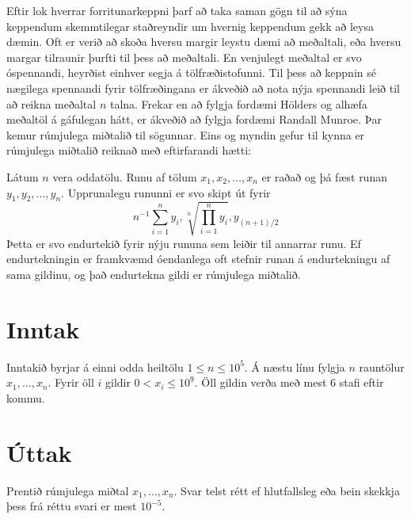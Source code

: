 
Eftir lok hverrar forritunarkeppni þarf að taka saman gögn
til að sýna keppendum skemmtilegar staðreyndir um hvernig
keppendum gekk að leysa dæmin. Oft er verið að skoða hversu
margir leystu dæmi að meðaltali, eða hversu margar tilraunir
þurfti til þess að meðaltali.
En venjulegt meðaltal er svo óspennandi, heyrðist einhver
segja á tölfræðistofunni. 
Til þess að keppnin sé nægilega spennandi fyrir tölfræðingana
er ákveðið að nota nýja spennandi leið til að reikna
meðaltal $n$ talna.
Frekar en að fylgja fordæmi Hölders og alhæfa meðaltöl á
gáfulegan hátt, er ákveðið að fylgja fordæmi Randall Munroe.
Þar kemur rúmjulega miðtalið til sögunnar.
Eins og myndin gefur til kynna er rúmjulega miðtalið
reiknað með eftirfarandi hætti:

Látum $n$ vera oddatölu.
Runu af tölum $x_1, x_2, \dots, x_n$ er raðað og þá fæst runan $y_1, y_2, \dots, y_n$.
Upprunalegu rununni er svo skipt út fyrir
\[
    n^{-1}\sum_{i = 1}^n y_i, \sqrt[n]{\prod_{i = 1}^n y_i}, y_{(n + 1)/2}
\]
Þetta er svo endurtekið fyrir nýju rununa sem leiðir til annarrar runu.
Ef endurtekningin er framkvæmd óendanlega oft stefnir runan á endurtekningu af sama gildinu, og
það endurtekna gildi er rúmjulega miðtalið.

\section*{Inntak}

Inntakið byrjar á einni odda heiltölu $1 \leq n \leq 10^5$.
Á næstu línu fylgja $n$ rauntölur $x_1, \dots, x_n$.
Fyrir öll $i$ gildir $0 < x_i \leq 10^9$.
Öll gildin verða með mest $6$ stafi eftir kommu.

\section*{Úttak}

Prentið rúmjulega miðtal $x_1, \dots, x_n$.
Svar telst rétt ef hlutfallsleg eða bein skekkja þess
frá réttu svari er mest $10^{-5}$.
